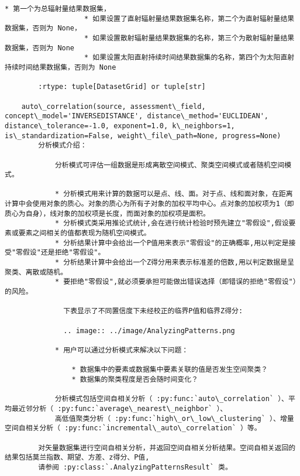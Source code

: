\documentclass[11pt]{article}
\begin{document}
\begin{Verbatim}[commandchars=\\\{\}]
                   * 第一个为总辐射量结果数据集，
                   * 如果设置了直射辐射量结果数据集名称，第二个为直射辐射量结果数据集，否则为 None，
                   * 如果设置散射辐射量结果数据集的名称，第三个为散射辐射量结果数据集，否则为 None
                   * 如果设置太阳直射持续时间结果数据集的名称，第四个为太阳直射持续时间结果数据集，否则为 None
        
        :rtype: tuple[DatasetGrid] or tuple[str]
    
    auto\_correlation(source, assessment\_field, concept\_model='INVERSEDISTANCE', distance\_method='EUCLIDEAN', distance\_tolerance=-1.0, exponent=1.0, k\_neighbors=1, is\_standardization=False, weight\_file\_path=None, progress=None)
        分析模式介绍：
        
            分析模式可评估一组数据是形成离散空间模式、聚类空间模式或者随机空间模式。
        
            * 分析模式用来计算的数据可以是点、线、面。对于点、线和面对象，在距离计算中会使用对象的质心。对象的质心为所有子对象的加权平均中心。点对象的加权项为1（即质心为自身），线对象的加权项是长度，而面对象的加权项是面积。
            * 分析模式类采用推论式统计,会在进行统计检验时预先建立"零假设",假设要素或要素之间相关的值都表现为随机空间模式。
            * 分析结果计算中会给出一个P值用来表示"零假设"的正确概率,用以判定是接受"零假设"还是拒绝"零假设"。
            * 分析结果计算中会给出一个Z得分用来表示标准差的倍数,用以判定数据是呈聚类、离散或随机。
            * 要拒绝"零假设",就必须要承担可能做出错误选择（即错误的拒绝"零假设"）的风险。
        
              下表显示了不同置信度下未经校正的临界P值和临界Z得分:
        
              .. image:: ../image/AnalyzingPatterns.png
        
            * 用户可以通过分析模式来解决以下问题：
        
                * 数据集中的要素或数据集中要素关联的值是否发生空间聚类？
                * 数据集的聚类程度是否会随时间变化？
        
            分析模式包括空间自相关分析（ :py:func:`auto\_correlation` ）、平均最近邻分析（ :py:func:`average\_nearest\_neighbor` ）、
            高低值聚类分析（ :py:func:`high\_or\_low\_clustering` ）、增量空间自相关分析（ :py:func:`incremental\_auto\_correlation` ）等。
        
        对矢量数据集进行空间自相关分析，并返回空间自相关分析结果。空间自相关返回的结果包括莫兰指数、期望、方差、z得分、P值,
        请参阅 :py:class:`.AnalyzingPatternsResult` 类。
        

\end{Verbatim}
\end{document}
